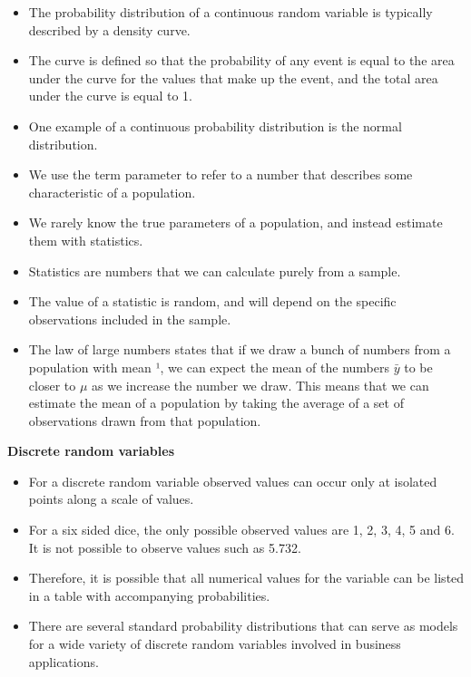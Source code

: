 \documentclass[]{report}
\begin{document}
{\begin{itemize}
\item The probability distribution of a continuous random variable is typically described by a density
curve. \item The curve is defined so that the probability of any event is equal to the area under the
curve for the values that make up the event, and the total area under the curve is equal to 1. \item One
example of a continuous probability distribution is the normal distribution.

\item We use the term parameter to refer to a number that describes some characteristic of a population. \item  We
rarely know the true parameters of a population, and instead estimate them with statistics. \item Statistics
are numbers that we can calculate purely from a sample. \item The value of a statistic is random, and will
depend on the specific observations included in the sample.

\item The law of large numbers states that if we draw a bunch of numbers from a population with mean ¹,
we can expect the mean of the numbers $\bar{y}$ to be closer to $\mu$ as we increase the number we draw. This
means that we can estimate the mean of a population by taking the average of a set of observations
drawn from that population.
\end{itemize}


\noindent 
\textbf{Discrete random variables}
\begin{itemize}
\item For a discrete random variable observed values can occur only at isolated points along a scale of values. \item For a six sided dice, the only possible observed values are 1, 2, 3, 4, 5 and 6. It is not possible to observe values such as 5.732.
\end{itemize}


\begin{itemize}

\item Therefore, it is possible that all numerical values for the variable can be listed in a table with accompanying
probabilities. 
\item
There are several standard probability distributions that can serve as models for a wide variety of discrete random variables involved in business applications. 


\end{itemize}}
\end{document}

